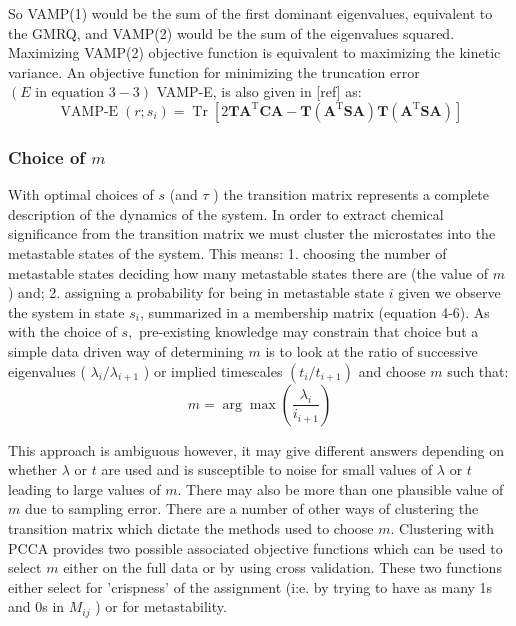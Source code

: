 So VAMP(1) would be the sum of the first dominant eigenvalues, equivalent to the GMRQ, and VAMP(2) would be the sum of the eigenvalues squared. Maximizing VAMP(2) objective function is equivalent to maximizing the kinetic variance. An objective function for minimizing the truncation error $(E \text { in equation } 3-3)$ VAMP-E, is also given in [ref] as:
\begin{equation}
\operatorname{V A M P-E}(r; s_{i})=\operatorname{Tr}\left[2 \mathbf{T} \mathbf{A}^{\mathrm{T}} \mathbf{C A}-\mathbf{T}\left(\mathbf{A}^{\mathrm{T}} \mathbf{S} \mathbf{A}\right) \mathbf{T}\left(\mathbf{A}^{\mathrm{T}} \mathbf{S} \mathbf{A}\right)\right]
\end{equation}

\subsubsection{Choice of $m$}
With optimal choices of $s$ (and $\tau$ ) the transition matrix represents a complete description of the dynamics of the system. In order to extract chemical significance from the transition matrix we must cluster the microstates into the metastable states of the system. This means:
1. choosing the number of metastable states deciding how many metastable states there are (the value of $m$ ) and;
2. assigning a probability for being in metastable state $i$ given we observe the system in state $s_{i}$, summarized in a membership matrix (equation 4-6).
As with the choice of $s,$ pre-existing knowledge may constrain that choice but a simple data driven way of determining $m$ is to look at the ratio of successive eigenvalues ( $\lambda_{i} / \lambda_{i+1}$ ) or implied timescales $\left(t_{i} / t_{i+1}\right)$ and choose $m$ such that:
\begin{equation}
m=\arg \max \left(\frac{\lambda_{i}}{i_{i+1}}\right)
\end{equation}

This approach is ambiguous however, it may give different answers depending on whether $\lambda$ or $t$ are used and is susceptible to noise for small values of $\lambda$ or $t$ leading to large values of $m$. There may also be more than one plausible value of $m$ due to sampling error.
There are a number of other ways of clustering the transition matrix which dictate the methods used to choose $m$. Clustering with PCCA provides two possible associated objective functions which can be used to select $m$ either on the full data or by using cross validation. These two functions either select for 'crispness' of the assignment (i:e. by trying to have as many 1s and 0s in $M_{i j}$ ) or for metastability.


